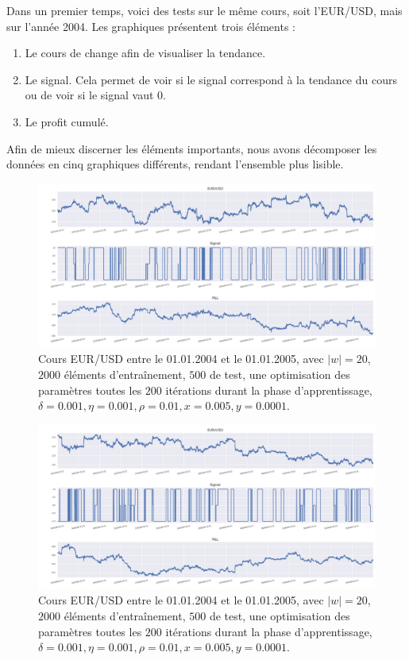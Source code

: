 \documentclass[a4paper, 11pt]{article}
\begin{document}
 Dans un premier temps, voici des tests sur le même cours, soit l'EUR/USD, mais sur l'année 2004.
 Les graphiques présentent trois éléments :
 \begin{enumerate}
  \item Le cours de change afin de visualiser la tendance.
  \item Le signal. Cela permet de voir si le signal correspond à la tendance du cours ou de voir si le signal vaut 0.
  \item Le profit cumulé.
 \end{enumerate}

Afin de mieux discerner les éléments importants, nous avons décomposer les  données en cinq graphiques différents, rendant l'ensemble plus lisible.
   \begin{figure}
\centering
\includegraphics[scale=0.5]{res/eursud_2004-2005_from_0to_10000}
\caption{Cours EUR/USD entre le 01.01.2004 et le 01.01.2005, avec $|w| = 20$, $2000$ éléments d'entraînement, $500$ de test, une optimisation des
paramètres toutes les $200$ itérations durant la phase d'apprentissage, $\delta = 0.001, \eta=0.001,\rho=0.01, x = 0.005, y=0.0001$.}
\end{figure}


 \begin{figure}
\centering
\includegraphics[scale=0.5]{res/eursud_2004-2005_from_10000to_20000}
\caption[Blup]{Cours EUR/USD entre le 01.01.2004 et le 01.01.2005, avec $|w| = 20$, $2000$ éléments d'entraînement, $500$ de test, une optimisation des
	paramètres toutes les $200$ itérations durant la phase d'apprentissage, $\delta = 0.001, \eta=0.001,\rho=0.01, x = 0.005, y=0.0001$.}
\end{figure}
\end{document}

